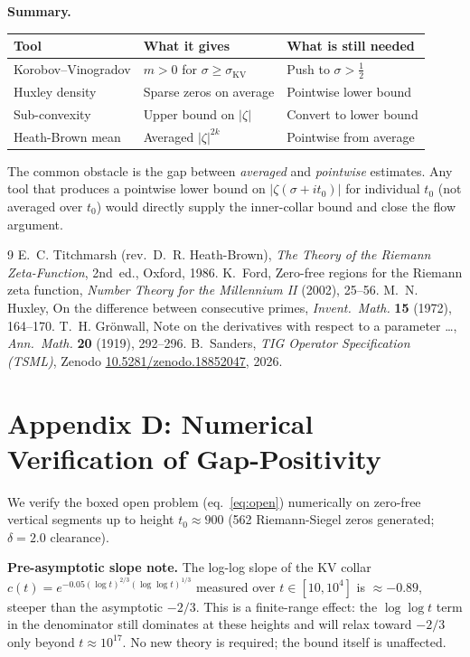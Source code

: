 \documentclass[11pt]{article}
\begin{document}
\medskip\noindent\textbf{Summary.}
\begin{center}
\begin{tabular}{lll}
\hline
Tool & What it gives & What is still needed \\
\hline
Korobov--Vinogradov & $m>0$ for $\sigma\ge\sigma_{\mathrm{KV}}$ & Push to $\sigma>\tfrac12$ \\
Huxley density & Sparse zeros on average & Pointwise lower bound \\
Sub-convexity & Upper bound on $|\zeta|$ & Convert to lower bound \\
Heath-Brown mean & Averaged $|\zeta|^{2k}$ & Pointwise from average \\
\hline
\end{tabular}
\end{center}
The common obstacle is the gap between \emph{averaged} and
\emph{pointwise} estimates.
Any tool that produces a pointwise lower bound on $|\zeta(\sigma+it_0)|$
for individual $t_0$ (not averaged over $t_0$) would directly supply
the inner-collar bound and close the flow argument.

\begin{thebibliography}{9}
  E.~C. Titchmarsh (rev.\ D.~R. Heath-Brown),
  \textit{The Theory of the Riemann Zeta-Function}, 2nd~ed.,
  Oxford, 1986.
  K.~Ford,
  Zero-free regions for the Riemann zeta function,
  \textit{Number Theory for the Millennium II} (2002), 25--56.
  M.~N. Huxley,
  On the difference between consecutive primes,
  \textit{Invent.\ Math.} \textbf{15} (1972), 164--170.
  T.~H. Gr\"onwall,
  Note on the derivatives with respect to a parameter \ldots,
  \textit{Ann.\ Math.} \textbf{20} (1919), 292--296.
  B.~Sanders, \textit{TIG Operator Specification (TSML)},
  Zenodo \href{https://doi.org/10.5281/zenodo.18852047}{10.5281/zenodo.18852047},
  2026.
\end{thebibliography}


\section*{Appendix D: Numerical Verification of Gap-Positivity}

We verify the boxed open problem (eq.~\ref{eq:open}) numerically
on zero-free vertical segments up to height $t_0\approx900$
(562 Riemann-Siegel zeros generated; $\delta=2.0$ clearance).

\medskip\noindent\textbf{Pre-asymptotic slope note.}
The log-log slope of the KV collar $c(t)=e^{-0.05(\log t)^{2/3}(\log\log t)^{1/3}}$
measured over $t\in[10,10^4]$ is $\approx-0.89$, steeper than the
asymptotic $-2/3$.
This is a finite-range effect: the $\log\log t$ term in the denominator
still dominates at these heights and will relax toward $-2/3$ only
beyond $t\approx10^{17}$.
No new theory is required; the bound itself is unaffected.
\end{document}
